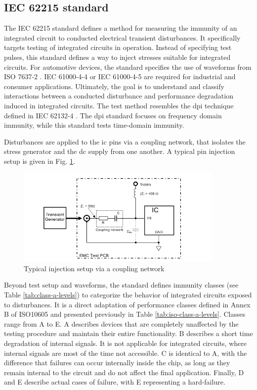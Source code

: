 \subsection{IEC 62215 standard}

The IEC 62215 standard \cite{iec62215} defines a method for measuring the immunity of an integrated circuit to conducted electrical transient disturbances.
It specifically targets testing of integrated circuits in operation.
Instead of specifying test pulses, this standard defines a way to inject stresses suitable for integrated circuits.
For automotive devices, the standard specifies the use of waveforms from ISO 7637-2 \cite{iso7637-2}.
IEC 61000-4-4 \cite{iec61000-4-4} or IEC 61000-4-5 are required for industrial and consumer applications.
Ultimately, the goal is to understand and classify interactions between a conducted disturbance and performance degradation induced in integrated circuits.
The test method resembles the \gls{dpi} technique defined in IEC 62132-4 \cite{iec62132-4}.
The \gls{dpi} standard focuses on frequency domain immunity, while this standard tests time-domain immunity.

Disturbances are applied to the \gls{ic} pins via a coupling network, that isolates the stress generator and the \gls{dc} supply from one another.
A typical pin injection setup is given in Fig. \ref{fig:iec62215_setup}.

\begin{figure}[!h]
  \centering
  \includegraphics[width=0.9\textwidth]{src/1/figures/iec62215_setup.png}
  \caption{Typical injection setup via a coupling network}
  \label{fig:iec62215_setup}
\end{figure}

Beyond test setup and waveforms, the standard defines immunity classes (see Table \ref{tab:class-a-levels}) to categorize the behavior of integrated circuits exposed to disturbances.
It is a direct adaptation of performance classes defined in Annex B of ISO10605 and presented previously in Table \ref{tab:iso-class-a-levels}.
Classes range from A to E.
A describes devices that are completely unaffected by the testing procedure and maintain their entire functionality.
B describes a short time degradation of internal signals. It is not applicable for integrated circuits, where internal signals are most of the time not accessible.
C is identical to A, with the difference that failures can occur internally inside the chip, as long as they remain internal to the circuit and do not affect the final application.
Finally, D and E describe actual cases of failure, with E representing a hard-failure.

